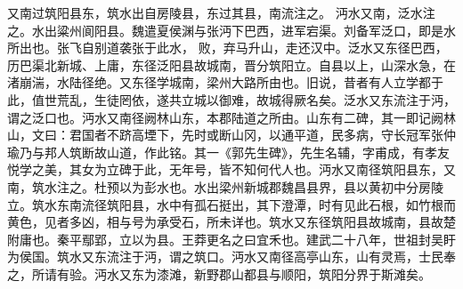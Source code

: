 \documentclass[12pt,UTF8]{ctexbook}
\begin{document}
又南过筑阳县东，筑水出自房陵县，东过其县，南流注之。
沔水又南，泛水注之。水出粱州阆阳县。魏遣夏侯渊与张沔下巴西，进军宕渠。刘备军泛口，即是水所出也。张飞自别道袭张于此水， 败，弃马升山，走还汉中。泛水又东径巴西，历巴渠北新城、上庸，东径泛阳县故城南，晋分筑阳立。自县以上，山深水急，在渚崩湍，水陆径绝。又东径学城南，梁州大路所由也。旧说，昔者有人立学都于此，值世荒乱，生徒罔依，遂共立城以御难，故城得厥名矣。泛水又东流注于沔，谓之泛口也。沔水又南径阙林山东，本郡陆道之所由。山东有二碑，其一即记阙林山，文曰：君国者不跻高堙下，先时或断山冈，以通平道，民多病，守长冠军张仲瑜乃与邦人筑断故山道，作此铭。其一《郭先生碑》，先生名辅，字甫成，有孝友悦学之美，其女为立碑于此，无年号，皆不知何代人也。沔水又南径筑阳县东，又南，筑水注之。杜预以为彭水也。水出梁州新城郡魏昌县界，县以黄初中分房陵立。筑水东南流径筑阳县，水中有孤石挺出，其下澄潭，时有见此石根，如竹根而黄色，见者多凶，相与号为承受石，所未详也。筑水又东径筑阳县故城南，县故楚附庸也。秦平鄢郢，立以为县。王莽更名之曰宜禾也。建武二十八年，世祖封吴盱为侯国。筑水又东流注于沔，谓之筑口。沔水又南径高亭山东，山有灵焉，士民奉之，所请有验。沔水又东为漆滩，新野郡山都县与顺阳，筑阳分界于斯滩矣。
\end{document}
